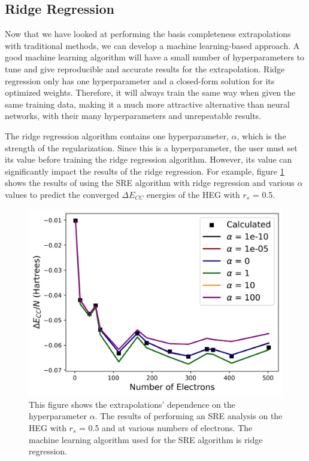 \subsection*{Ridge Regression}

Now that we have looked at performing the basis completeness extrapolations with traditional methods, we can develop a machine learning-based approach. A good machine learning algorithm will have a small number of hyperparameters to tune and give reproducible and accurate results for the extrapolation. Ridge regression only has one hyperparameter and a closed-form solution for its optimized weights. Therefore, it will always train the same way when given the same training data, making it a much more attractive alternative than neural networks, with their many hyperparameters and unrepeatable results.

The ridge regression algorithm contains one hyperparameter, $\alpha$, which is the strength of the regularization. Since this is a hyperparameter, the user must set its value before training the ridge regression algorithm. However, its value can significantly impact the results of the ridge regression. For example, figure \ref{fig:vary_alpha} shows the results of using the SRE algorithm with ridge regression and various $\alpha$ values to predict the converged $\Delta E_{CC}$ energies of the HEG with $r_s$ = 0.5.

\begin{figure}
    \centering
    \includegraphics[scale=0.75]{Images/Chapter7/ElectronGas/vary_alpha.png}
    \caption{This figure shows the extrapolations' dependence on the hyperparameter $\alpha$. The results of performing an SRE analysis on the HEG with $r_s$ = 0.5 and at various numbers of electrons. The machine learning algorithm used for the SRE algorithm is ridge regression.}
    \label{fig:vary_alpha}
\end{figure}

